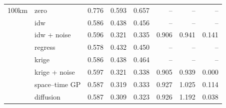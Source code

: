 \begin{tabular}{llrrrrrr}
\addlinespace
100km & zero & 0.776 & 0.593 & 0.657 & -- & -- & -- \\
 & idw & 0.586 & 0.438 & 0.456 & -- & -- & -- \\
 & idw + noise & 0.596 & 0.321 & 0.335 & 0.906 & 0.941 & 0.141 \\
 & regress & 0.578 & 0.432 & 0.450 & -- & -- & -- \\
 & krige & 0.586 & 0.438 & 0.464 & -- & -- & -- \\
 & krige + noise & 0.597 & 0.321 & 0.338 & 0.905 & 0.939 & 0.000 \\
 & space–time GP & 0.587 & 0.319 & 0.333 & 0.927 & 1.025 & 0.114 \\
 & diffusion & 0.587 & 0.309 & 0.323 & 0.926 & 1.192 & 0.038 \\
\bottomrule
\end{tabular}

